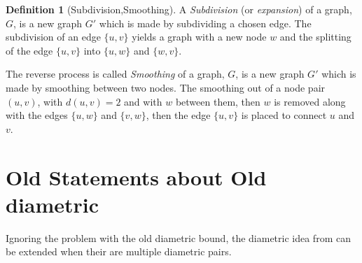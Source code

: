\documentclass[a4paper,10pt]{article}
\theoremstyle{definition}
\newtheorem{definition}[theorem]{Definition}
\theoremstyle{definition}
\theoremstyle{remark}
\theoremstyle{definition}
\begin{document}
\begin{definition}[Subdivision,Smoothing]
A \textit{Subdivision} (or \textit{expansion}) of a graph, $G$, is a new graph $G'$ which is made by subdividing a chosen edge. The subdivision of an edge $\{u,v\}$ yields a graph with a new node $w$ and the splitting of the edge $\{u,v\}$ into $\{u,w\}$ and $\{w,v\}$.

The reverse process is called \textit{Smoothing} of a graph, $G$, is a new graph $G'$ which is made by smoothing between two nodes. The smoothing out of a node pair $(u,v)$, with $d(u,v)=2$ and with $w$ between them, then $w$ is removed along with the edges $\{u,w\}$ and $\{v,w\}$, then the edge $\{u,v\}$ is placed to connect $u$ and $v$. 
\end{definition}

\begin{myfigure}
\begin{center}
\caption{Subdivision and Smoothing of the edge $\{1,2\}$}
\end{center}
\end{myfigure}

\section{Old Statements about Old diametric}
Ignoring the problem with the old diametric bound, the diametric idea from \citep{Alpern2011} can be extended when their are multiple diametric pairs. 
\end{document}
